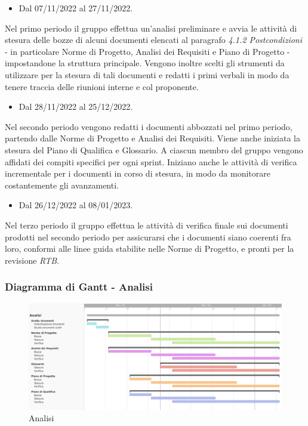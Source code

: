 \begin{itemize}
    \item Dal 07/11/2022 al 27/11/2022.
\end{itemize}
Nel primo periodo il gruppo effettua un’analisi preliminare e avvia le attività di stesura delle bozze di alcuni documenti elencati al paragrafo \textit{4.1.2 Postcondizioni} - in particolare Norme di Progetto, Analisi dei Requisiti e Piano di Progetto - impostandone la struttura principale. Vengono inoltre scelti gli strumenti da utilizzare per la stesura di tali documenti e redatti i primi verbali in modo da tenere traccia delle riunioni interne e col proponente.

\begin{itemize}
    \item Dal 28/11/2022 al 25/12/2022.
\end{itemize}
Nel secondo periodo vengono redatti i documenti abbozzati nel primo periodo, partendo dalle Norme di Progetto e Analisi dei Requisiti. Viene anche iniziata la stesura del Piano di Qualifica e Glossario.
A ciascun membro del gruppo vengono affidati dei compiti specifici per ogni sprint. Iniziano anche le attività di verifica incrementale per i documenti in corso di stesura, in modo da monitorare costantemente gli avanzamenti.

\begin{itemize}
    \item Dal 26/12/2022 al 08/01/2023.
\end{itemize}
Nel terzo periodo il gruppo effettua le attività di verifica finale sui documenti prodotti nel secondo periodo per assicurarsi che i documenti siano coerenti fra loro, conformi alle linee guida stabilite nelle Norme di Progetto, e pronti per la revisione \textit{RTB}.

\subsubsection{Diagramma di Gantt - Analisi}

\begin{figure}[H]
\centering
\includegraphics[width=\textwidth]{img/4_analisi.png}
\caption{Analisi}
\end{figure}

